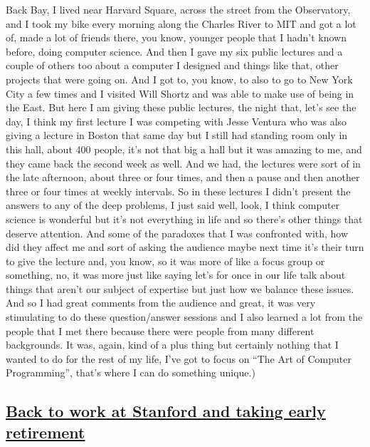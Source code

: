 \documentclass[]{article}
\begin{document}
Back Bay, I lived near Harvard Square, across the street from the
Observatory, and I took my bike every morning along the Charles River to
MIT and got a lot of, made a lot of friends there, you know, younger
people that I hadn't known before, doing computer science. And then I
gave my six public lectures and a couple of others too about a computer
I designed and things like that, other projects that were going on. And
I got to, you know, to also to go to New York City a few times and I
visited Will Shortz and was able to make use of being in the East. But
here I am giving these public lectures, the night that, let's see the
day, I think my first lecture I was competing with Jesse Ventura who was
also giving a lecture in Boston that same day but I still had standing
room only in this hall, about 400 people, it's not that big a hall but
it was amazing to me, and they came back the second week as well. And we
had, the lectures were sort of in the late afternoon, about three or
four times, and then a pause and then another three or four times at
weekly intervals. So in these lectures I didn't present the answers to
any of the deep problems, I just said well, look, I think computer
science is wonderful but it's not everything in life and so there's
other things that deserve attention. And some of the paradoxes that I
was confronted with, how did they affect me and sort of asking the
audience maybe next time it's their turn to give the lecture and, you
know, so it was more of like a focus group or something, no, it was more
just like saying let's for once in our life talk about things that
aren't our subject of expertise but just how we balance these issues.
And so I had great comments from the audience and great, it was very
stimulating to do these question/answer sessions and I also learned a
lot from the people that I met there because there were people from many
different backgrounds. It was, again, kind of a plus thing but certainly
nothing that I wanted to do for the rest of my life, I've got to focus
on ``The Art of Computer Programming'', that's where I can do something
unique.)

\subsection{\texorpdfstring{\href{http://webofstories.com/play/17135}{Back
to work at Stanford and taking early
retirement}}{Back to work at Stanford and taking early retirement}}\label{back-to-work-at-stanford-and-taking-early-retirement}
\end{document}
